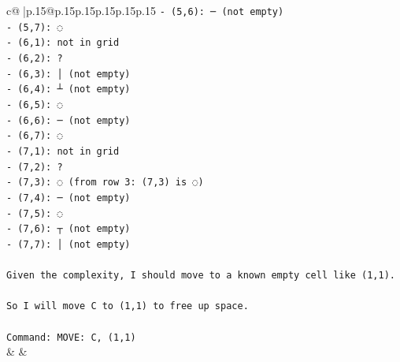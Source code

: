 \documentclass{article}
\begin{document}
{\begin{supertabular}{c@{$\;$}|p{.15\linewidth}@{}p{.15\linewidth}p{.15\linewidth}p{.15\linewidth}p{.15\linewidth}p{.15\linewidth}}
{{{\texttt{{-} (5,6): ─ (not empty)} \\
\texttt{{-} (5,7): ◌} \\
\texttt{{-} (6,1): not in grid} \\
\texttt{{-} (6,2): ?} \\
\texttt{{-} (6,3): │ (not empty)} \\
\texttt{{-} (6,4): ┴ (not empty)} \\
\texttt{{-} (6,5): ◌} \\
\texttt{{-} (6,6): ─ (not empty)} \\
\texttt{{-} (6,7): ◌} \\
\texttt{{-} (7,1): not in grid} \\
\texttt{{-} (7,2): ?} \\
\texttt{{-} (7,3): ◌ (from row 3: (7,3) is ◌)} \\
\texttt{{-} (7,4): ─ (not empty)} \\
\texttt{{-} (7,5): ◌} \\
\texttt{{-} (7,6): ┬ (not empty)} \\
\texttt{{-} (7,7): │ (not empty)} \\
\\ 
\texttt{Given the complexity, I should move to a known empty cell like (1,1).} \\
\\ 
\texttt{So I will move C to (1,1) to free up space.} \\
\\ 
\texttt{Command: MOVE: C, (1,1)} \\
            }
        }
    }
    & & \\ \\


\end{supertabular}}
\end{document}
